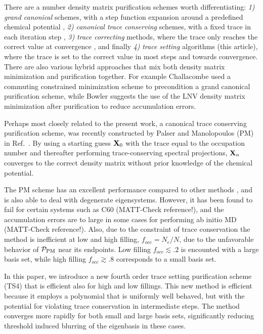 \commentoutA{\documentclass[prb,aps,twocolumn,twocolumngrid,secnumarabic,superbib,hyperref]{revtex4}}
\begin{document}
There are a number density matrix purification schemes worth differentiating: 
{\it 1)} {\it grand canonical} schemes, with a step function  expansion around a predefined 
         chemical potential \cite{McWeeny60,Palser98,Holas01},
{\it 2)} {\it canonical trace conserving} schemes, with a fixed trace
         in each iteration step \cite{Palser98}, 
{\it 3)} {\it trace correcting} methods, where the trace only reaches the correct value at 
         convergence \cite{Niklasson02b}, and finally 
{\it 4)} {\it trace setting} algorithms (this article), where the 
         trace is set to the correct value in most steps and towards convergence.
There are also various hybrid approaches that mix both density matrix minimization and 
purification together.  For example
Challacombe\cite{Challacombe99} used a commuting constrained minimization scheme to precondition 
a grand canonical purification scheme,
while Bowler \cite{Bowler99} suggests the use of the LNV density matrix minimization 
after purification to reduce accumulation errors.

Perhaps most closely related to the present work, a canonical trace 
conserving purification scheme, was recently constructed by Palser and Manolopoulos 
(PM) in Ref.~. 
By using a starting guess ${\bf X}_0$ with the trace equal to 
the occupation number and thereafter performing trace-conserving
spectral projections, ${\bf X}_n$ converges to the correct density matrix without
prior knowledge of the chemical potential. 

The PM scheme has an excellent
performance compared to other methods \cite{Palser98,Daniels99}, and is also
able to deal with degenerate eigensystems.  However, it has been found
to fail for certain systems such as C60 \cite{Daniels99} (MATT-Check reference!), and the accumulation
errors are to large in some cases for performing ab initio MD \cite{DBowler00} (MATT-Check reference!).
Also, due to the constraint of trace conservation the method is inefficient at low 
and high filling, $f_{occ}=N_e/N$, due to the unfavorable behavior of ${\cal P}_{\rm PM}$ near 
its endpoints.  Low filling $f_{occ}\lesssim .2$  is encounted 
with a large basis set, while high filling $f_{occ} \gtrsim .8$ corresponds to a small basis set.

In this paper, we introduce a new fourth order trace setting purification scheme (TS4) 
that is efficient also for high and low fillings.  This new method is 
efficient because it employs a polynomial that is uniformly well behaved, but with the
potential for violating trace conservation in intermediate steps.  The method
converges more rapidly for both small and large basis sets, significantly reducing 
threshold induced blurring of the eigenbasis in these cases.
\end{document}
